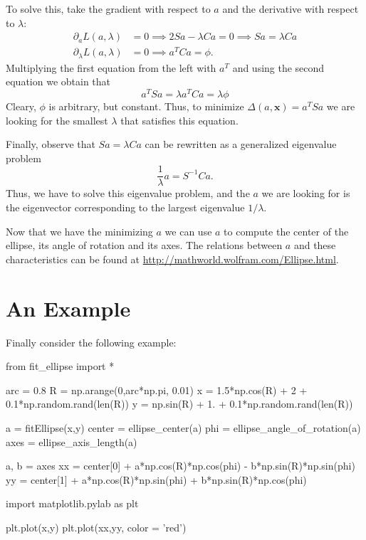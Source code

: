 \documentclass[a4paper,11pt]{article}
\begin{document}
To solve this, take the gradient with respect to $a$ and the derivative with respect to $\lambda$:
\begin{align*}
  \partial_a L(a, \lambda) & = 0 \implies 2 S a - \lambda C a  = 0 \implies S a = \lambda C a \\
  \partial_\lambda L(a, \lambda) & = 0 \implies a^T C a = \phi.
\end{align*}
Multiplying the first equation from the left with $a^T$ and using the second equation we obtain that
\begin{equation*}
a^T S a = \lambda a^T C a = \lambda \phi
\end{equation*}
Cleary, $\phi$ is arbitrary, but constant. Thus, to minimize
$\Delta(a, \mathbf{x})= a^T S a$ we are looking for the smallest
$\lambda$ that satisfies this equation.

Finally, observe that $S a = \lambda C a$ can be rewritten as a generalized eigenvalue problem
%
\begin{equation*}
\frac{1}{\lambda} a = S^{-1} C a.
\end{equation*}
Thus, we have to solve this eigenvalue problem, and the $a$ we are looking for is the eigenvector corresponding to the largest eigenvalue $1/\lambda$.

Now that we have the minimizing $a$ we can use $a$ to compute the center of the ellipse, its angle of rotation and its axes.
The relations between $a$ and these characteristics can be found at \url{http://mathworld.wolfram.com/Ellipse.html}.

\section{An Example}

Finally consider the following example:

\begin{pyblock}
from fit_ellipse import *

arc = 0.8
R = np.arange(0,arc*np.pi, 0.01)
x = 1.5*np.cos(R) + 2 + 0.1*np.random.rand(len(R))
y = np.sin(R) + 1. + 0.1*np.random.rand(len(R))

a = fitEllipse(x,y)
center = ellipse_center(a)
phi = ellipse_angle_of_rotation(a)
axes = ellipse_axis_length(a)

a, b = axes
xx = center[0] + a*np.cos(R)*np.cos(phi) - b*np.sin(R)*np.sin(phi)
yy = center[1] + a*np.cos(R)*np.sin(phi) + b*np.sin(R)*np.cos(phi)

import matplotlib.pylab as plt

plt.plot(x,y)
plt.plot(xx,yy, color = 'red')
\end{pyblock}
\end{document}

